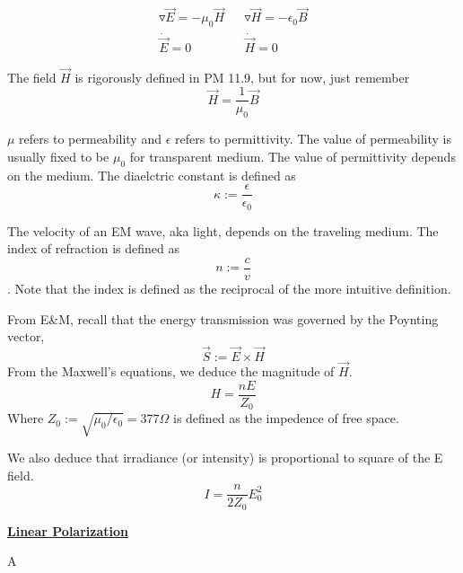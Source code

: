 \documentclass{article}
\newcommand{\new}[1]{
    \vspace{2mm}
    \noindent
    \textbf{
    \underline{#1}}
}
\begin{document}
\begin{align*}
    \triangledown \vec{E} = -\mu_0 \vec{H}
    &&
    \triangledown \vec{H} = -\epsilon_0 \vec{B}
    \\
    \dot{\vec{E}} = 0 
    &&
    \dot{\vec{H}} = 0
\end{align*}

The field $\vec{H}$ is rigorously defined in PM 11.9, 
but for now, just remember 
\[
    \vec{H} = \frac 1 { \mu_0} \vec{B}
\]

$\mu$ refers to permeability and $\epsilon$ refers to 
permittivity. The value of permeability is usually 
fixed to be $\mu_0$ for transparent medium. The value of permittivity depends 
on the medium. The diaelctric constant is defined as 
\[
    \kappa := \frac \epsilon {\epsilon_0}
\]

The velocity of an EM wave, aka light, depends on the traveling 
medium. The index of refraction is defined as 
\[
    n := \frac c v
\]
. Note that the index is defined as the reciprocal of the 
more intuitive definition. 

From E\&M, recall that the energy transmission was governed 
by the Poynting vector, 
\[
    \vec{S} := \vec E \times \vec H
\]
From the Maxwell's equations, we deduce the magnitude of $\vec{H}$. 
\[
    H = \frac {nE}{Z_0}
\]
Where $Z_0 := \sqrt{\mu_0/\epsilon_0} = 377 \Omega$ is defined 
as the impedence of free space. 

We also deduce that irradiance (or intensity) is proportional 
to square of the E field. 
\[
    I = \frac n {2Z_0} E_0^2
\]


\new{Linear Polarization}

A 
\end{document}
